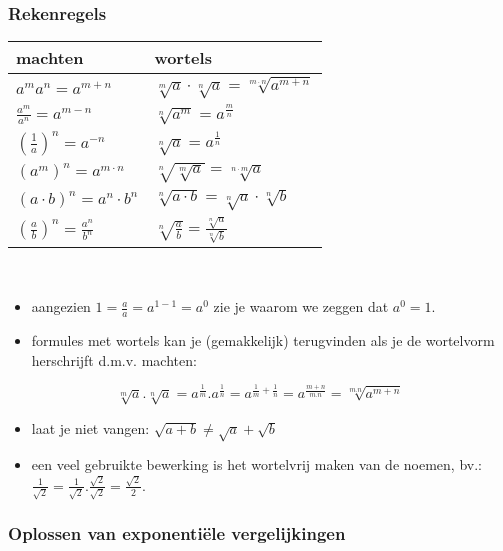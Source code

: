 \subsubsection{Rekenregels}

\begin{tabel}{}
\begin{tabular}{l|l}
machten & wortels\\
\hline 
$a^{m}a^{n}=a^{m+n}$ & $\sqrt[m]{a}\cdot\sqrt[n]{a}=\sqrt[m\cdot n]{a^{m+n}}$\\
$\frac{a^{m}}{a^{n}}=a^{m-n}$ & $\sqrt[n]{a^{m}}=a^{\frac{m}{n}}$\\
$\left(\frac{1}{a}\right)^{n}=a^{-n}$ & $\sqrt[n]{a}=a^{\frac{1}{n}}$\\
$\left(a^{m}\right)^{n}=a^{m\cdot n}$ & $\sqrt[n]{\sqrt[m]{a}}=\sqrt[n\cdot m]{a}$\\
$\left(a\cdot b\right)^{n}=a^{n}\cdot b^{n}$ & $\sqrt[n]{a\cdot b}=\sqrt[n]{a}\cdot \sqrt[n]{b}$\\
$\left(\frac{a}{b}\right)^{n}=\frac{a^{n}}{b^{n}}$ & $\sqrt[n]{\frac{a}{b}}=\frac{\sqrt[n]{a}}{\sqrt[n]{b}}$\\
\end{tabular}
\end{tabel}


\begin{opmerking}
	\ \\
	\begin{itemize}
\item aangezien $1=\frac{a}{a}=a^{1-1}=a^{0}$ zie je waarom
we zeggen dat $a^{0}=1$.
\item formules met wortels kan je (gemakkelijk) terugvinden als je de wortelvorm
herschrijft d.m.v. machten:
\end{itemize}
\begin{equation*}
\sqrt[m]{a}.\sqrt[n]{a}=a^{\frac{1}{m}}.a^{\frac{1}{n}}=a^{\frac{1}{m}+\frac{1}{n}}=a^{\frac{m+n}{m.n}}=\sqrt[m.n]{a^{m+n}}
\end{equation*}
\begin{itemize}
\item laat je niet vangen: $\sqrt{a+b}\neq\sqrt{a}+\sqrt{b}$
\item een veel gebruikte bewerking is het wortelvrij maken van de noemen,
bv.: $\frac{1}{\sqrt{2}}=\frac{1}{\sqrt{2}}.\frac{\sqrt{2}}{\sqrt{2}}=\frac{\sqrt{2}}{2}.$
\end{itemize}
\end{opmerking}

\subsubsection{Oplossen van exponenti\"ele vergelijkingen}


